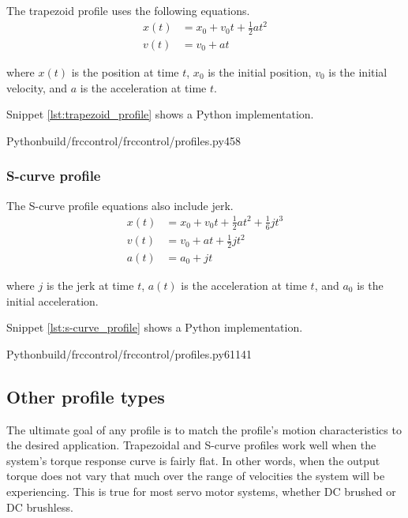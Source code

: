 The trapezoid profile uses the following equations.
\begin{align*}
  x(t) &= x_0 + v_0t + \frac{1}{2}at^2 \\
  v(t) &= v_0 + at
\end{align*}

where $x(t)$ is the position at time $t$, $x_0$ is the initial position, $v_0$
is the initial velocity, and $a$ is the acceleration at time $t$.

Snippet \ref{lst:trapezoid_profile} shows a Python implementation.
\begin{codesubset}{Python}{build/frccontrol/frccontrol/profiles.py}{4}{58}
  \caption{Trapezoid profile implementation in Python}
  \label{lst:trapezoid_profile}
\end{codesubset}

\subsubsection{S-curve profile}

The S-curve profile equations also include jerk.
\begin{align*}
  x(t) &= x_0 + v_0t + \frac{1}{2}at^2 + \frac{1}{6}jt^3 \\
  v(t) &= v_0 + at + \frac{1}{2}jt^2 \\
  a(t) &= a_0 + jt
\end{align*}

where $j$ is the jerk at time $t$, $a(t)$ is the acceleration at time $t$, and
$a_0$ is the initial acceleration.

Snippet \ref{lst:s-curve_profile} shows a Python implementation.
\begin{codesubset}{Python}{build/frccontrol/frccontrol/profiles.py}{61}{141}
  \caption{S-curve profile implementation in Python}
  \label{lst:s-curve_profile}
\end{codesubset}

\subsection{Other profile types}

The ultimate goal of any profile is to match the profile's motion
characteristics to the desired application. Trapezoidal and S-curve profiles
work well when the \gls{system}'s torque response curve is fairly flat. In other
words, when the output torque does not vary that much over the range of
velocities the \gls{system} will be experiencing. This is true for most servo
motor systems, whether DC brushed or DC brushless.

